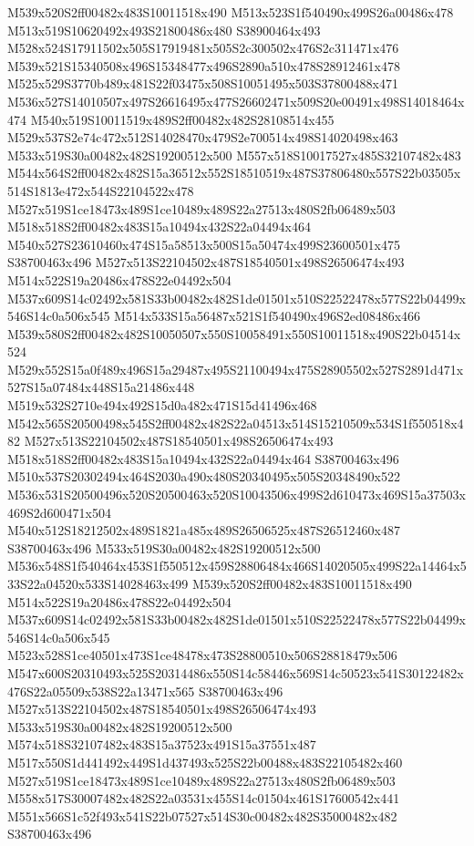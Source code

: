 \documentclass{article}
\begin{document}
\begin{multicols}{2}



M539x520S2ff00482x483S10011518x490 M513x523S1f540490x499S26a00486x478 M513x519S10620492x493S21800486x480 S38900464x493 M528x524S17911502x505S17919481x505S2c300502x476S2c311471x476 M539x521S15340508x496S15348477x496S2890a510x478S28912461x478 M525x529S3770b489x481S22f03475x508S10051495x503S37800488x471 M536x527S14010507x497S26616495x477S26602471x509S20e00491x498S14018464x474 M540x519S10011519x489S2ff00482x482S28108514x455 M529x537S2e74c472x512S14028470x479S2e700514x498S14020498x463 M533x519S30a00482x482S19200512x500 M557x518S10017527x485S32107482x483 M544x564S2ff00482x482S15a36512x552S18510519x487S37806480x557S22b03505x514S1813e472x544S22104522x478 M527x519S1ce18473x489S1ce10489x489S22a27513x480S2fb06489x503 M518x518S2ff00482x483S15a10494x432S22a04494x464 M540x527S23610460x474S15a58513x500S15a50474x499S23600501x475 S38700463x496 M527x513S22104502x487S18540501x498S26506474x493 M514x522S19a20486x478S22e04492x504 M537x609S14c02492x581S33b00482x482S1de01501x510S22522478x577S22b04499x546S14c0a506x545 M514x533S15a56487x521S1f540490x496S2ed08486x466 M539x580S2ff00482x482S10050507x550S10058491x550S10011518x490S22b04514x524 M529x552S15a0f489x496S15a29487x495S21100494x475S28905502x527S2891d471x527S15a07484x448S15a21486x448 M519x532S2710e494x492S15d0a482x471S15d41496x468 M542x565S20500498x545S2ff00482x482S22a04513x514S15210509x534S1f550518x482 M527x513S22104502x487S18540501x498S26506474x493 M518x518S2ff00482x483S15a10494x432S22a04494x464 S38700463x496 M510x537S20302494x464S2030a490x480S20340495x505S20348490x522 M536x531S20500496x520S20500463x520S10043506x499S2d610473x469S15a37503x469S2d600471x504 M540x512S18212502x489S1821a485x489S26506525x487S26512460x487 S38700463x496 M533x519S30a00482x482S19200512x500 M536x548S1f540464x453S1f550512x459S28806484x466S14020505x499S22a14464x533S22a04520x533S14028463x499 M539x520S2ff00482x483S10011518x490 M514x522S19a20486x478S22e04492x504 M537x609S14c02492x581S33b00482x482S1de01501x510S22522478x577S22b04499x546S14c0a506x545 M523x528S1ce40501x473S1ce48478x473S28800510x506S28818479x506 M547x600S20310493x525S20314486x550S14c58446x569S14c50523x541S30122482x476S22a05509x538S22a13471x565 S38700463x496 M527x513S22104502x487S18540501x498S26506474x493 M533x519S30a00482x482S19200512x500 M574x518S32107482x483S15a37523x491S15a37551x487 M517x550S1d441492x449S1d437493x525S22b00488x483S22105482x460 M527x519S1ce18473x489S1ce10489x489S22a27513x480S2fb06489x503 M558x517S30007482x482S22a03531x455S14c01504x461S17600542x441 M551x566S1c52f493x541S22b07527x514S30c00482x482S35000482x482 S38700463x496 
\end{multicols}
\end{document}
